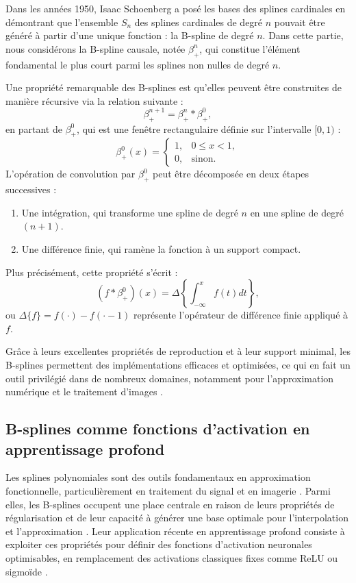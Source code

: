 \documentclass[a4paper, 12pt]{report} %
\begin{document}
Dans les années 1950, Isaac Schoenberg a posé les bases des splines cardinales \cite{schoenberg1967spline} en démontrant que l’ensemble \( S_n \) des splines cardinales de degré \( n \) pouvait être généré à partir d’une unique fonction : la B-spline de degré \( n \). Dans cette partie, nous considérons la B-spline causale, notée \( \beta_{+}^{n} \), qui constitue l’élément fondamental le plus court parmi les splines non nulles de degré \( n \).  

Une propriété remarquable des B-splines est qu'elles peuvent être construites de manière récursive via la relation suivante :
\[
\beta_{+}^{n+1} = \beta_{+}^{n} * \beta_{+}^{0},
\]
en partant de \( \beta_{+}^{0} \), qui est une fenêtre rectangulaire définie sur l’intervalle \([0, 1)\) :
\[
\beta_{+}^{0}(x) =
\begin{cases}
1, & 0 \leq x < 1, \\
0, & \text{sinon}.
\end{cases}
\]
L'opération de convolution par \( \beta_{+}^{0} \) peut être décomposée en deux étapes successives :  
\begin{enumerate}
\item Une intégration, qui transforme une spline de degré \( n \) en une spline de degré \( (n + 1) \).  
\item Une différence finie, qui ramène la fonction à un support compact.
\end{enumerate}

Plus précisément, cette propriété s'écrit :
\[
(f * \beta_{+}^{0})(x) = \Delta\left\{ \int_{-\infty}^{x} f(t) dt \right\},
\]
ou \( \Delta\{f\} = f(\cdot) - f(\cdot - 1) \) représente l'opérateur de différence finie appliqué à \( f \).  

Grâce à leurs excellentes propriétés de reproduction et à leur support minimal, les B-splines permettent des implémentations efficaces et optimisées, ce qui en fait un outil privilégié dans de nombreux domaines, notamment pour l’approximation numérique et le traitement d’images \cite{de1972calculating, unser1993b}. 

\subsection{B-splines comme fonctions d'activation en apprentissage profond}

Les splines polynomiales sont des outils fondamentaux en approximation fonctionnelle, particulièrement en traitement du signal et en imagerie \cite{unser1999splines}. Parmi elles, les B-splines occupent une place centrale en raison de leurs propriétés de régularisation et de leur capacité à générer une base optimale pour l'interpolation et l'approximation \cite{schoenberg1967spline}. Leur application récente en apprentissage profond consiste à exploiter ces propriétés pour définir des fonctions d'activation neuronales optimisables, en remplacement des activations classiques fixes comme ReLU ou sigmoïde \cite{bohra2020learning}.
\end{document}

